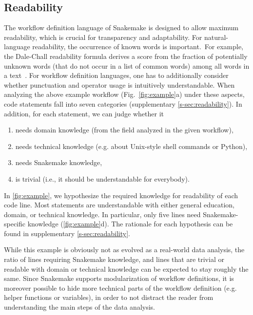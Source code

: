 \documentclass[10pt,a4paper,twocolumn]{article}
\begin{document}
\subsection{Readability}

The workflow definition language of Snakemake is designed to allow maximum readability, which is crucial for transparency and adaptability.
For natural-language readability, the occurrence of known words is important.~For example, the Dale-Chall readability formula derives a score from the fraction of potentially unknown words (that do not occur in a list of common words) among all words in a text~\parencite{chall_readability_1995}.
For workflow definition languages, one has to additionally consider whether punctuation and operator usage is intuitively understandable.
When analyzing the above example workflow (Fig.~\ref{fig:example}a) under these aspects, code statements fall into seven categories (supplementary \autoref{s-sec:readability}).
In addition, for each statement, we can judge whether it

\begin{enumerate}
	\item needs domain knowledge (from the field analyzed in the given workflow),
	\item needs technical knowledge (e.g. about Unix-style shell commands or Python),
	\item needs Snakemake knowledge,
	\item is trivial (i.e., it should be understandable for everybody).
\end{enumerate}

In \autoref{fig:example}, we hypothesize the required knowledge for readability of each code line.
Most statements are understandable with either general education, domain, or technical knowledge.
In particular, only five lines need Snakemake-specific knowledge (\autoref{fig:example}d).
The rationale for each hypothesis can be found in supplementary \autoref{s-sec:readability}.

While this example is obviously not as evolved as a real-world data analysis, the ratio of lines requiring Snakemake knowledge, and lines that are trivial or readable with domain or technical knowledge can be expected to stay roughly the same.
Since Snakemake supports modularization of workflow definitions, it is moreover possible to hide more technical parts of the workflow definition (e.g. helper functions or variables), in order to not distract the reader from understanding the main steps of the data analysis.
\end{document}
